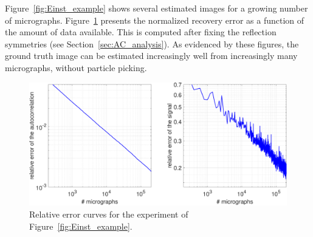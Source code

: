\documentclass[12pt]{article}
\newcommand{\1}{\mathbf{1}}
\theoremstyle{plain}
\theoremstyle{definition}
\theoremstyle{remark}
\theoremstyle{plain}
\theoremstyle{remark}
\theoremstyle{plain}
\theoremstyle{plain}
\theoremstyle{plain}
\numberwithin{equation}{section}
\begin{document}
Figure~\ref{fig:Einst_example} shows several estimated images for a growing number of micrographs. 
Figure~\ref{fig:error_per_micro} %
presents the normalized recovery error as a function of the amount of data available.  This is computed after fixing the reflection symmetries (see Section~\ref{sec:AC_analysis}). As evidenced by these figures, the ground truth image can be estimated increasingly well from increasingly many micrographs, without particle picking.


\begin{figure}[h]
	\centering
	\includegraphics[width=.8\linewidth]{Einstein_recovery_error_combined}
	\caption{\label{fig:error_per_micro}Relative error curves for the experiment of Figure~\ref{fig:Einst_example}.}
\end{figure}
\end{document}
